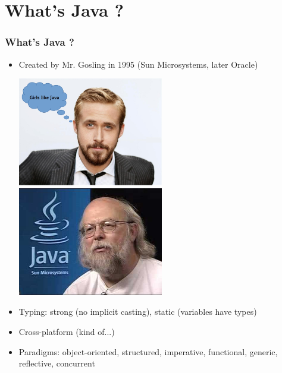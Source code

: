 
\section{What's Java ?}



\begin{frame}
  \frametitle{What's Java ?}
  \begin{itemize}
    \item Created by Mr. Gosling in 1995 (Sun Microsystems, later Oracle)
    \begin{center}
      \includegraphics[width=0.5\textwidth]{fig/young}
      \includegraphics[width=0.5\textwidth]{fig/old}
    \end{center}

    \item Typing: strong (no implicit casting), static (variables have types)
    \item Cross-platform (kind of...)
    \item Paradigms: object-oriented, structured, imperative, functional, generic, reflective, concurrent
  \end{itemize}
\end{frame}



